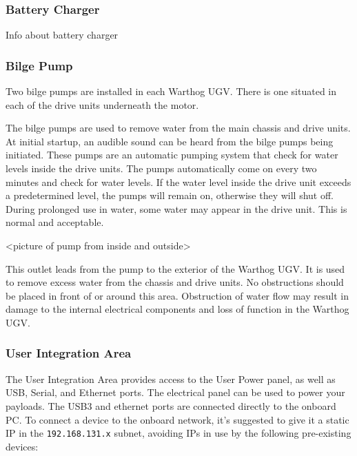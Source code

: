 \documentclass[]{clearpath-latex/clearpath-manual}
\begin{document}
\pagebreak[4]
\subsubsection{Battery Charger}
Info about battery charger

\subsubsection{Bilge Pump}
Two bilge pumps are installed in each Warthog UGV. There is one situated in each of the drive units underneath the motor.

The bilge pumps are used to remove water from the main chassis and drive units. At initial startup, an audible sound can be heard from the bilge pumps being initiated. These pumps are an automatic pumping system that check for water levels inside the drive units. The pumps automatically come on every two minutes and check for water levels. If the water level inside the drive unit exceeds a predetermined level, the pumps will remain on, otherwise they will shut off. During prolonged use in water, some water may appear in the drive unit. This is normal and acceptable.

<picture of pump from inside and outside>

This outlet leads from the pump to the exterior of the Warthog UGV. It is used to remove excess water from the chassis and drive units. No obstructions should be placed in front of or around this area. Obstruction of water flow may result in damage to the internal electrical components and loss of function in the Warthog UGV.

\subsubsection{User Integration Area}\label{userarea}

The User Integration Area provides access to the User Power panel, as well as USB, Serial, and Ethernet ports.  The electrical panel can be used to power your payloads. The USB3 and ethernet  ports are connected directly to the onboard PC. To connect a device to the onboard network, it's suggested to give it a static IP in the \lstinline{192.168.131.x} subnet, avoiding IPs in use by the following pre-existing devices:
\end{document}
